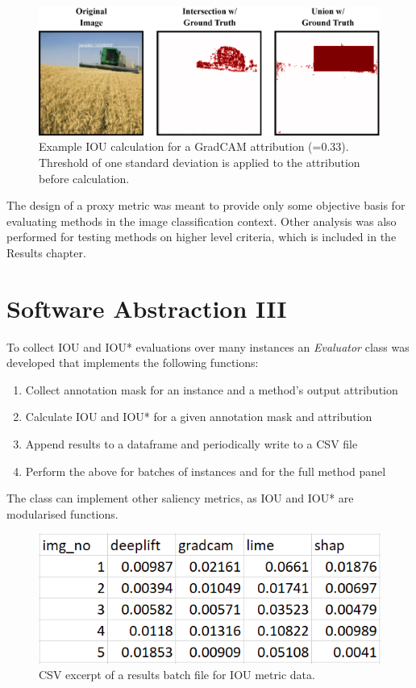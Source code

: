 \documentclass[main]{subfiles}
\begin{document}
\begin{figure}[htbp]
\centering
\includegraphics[scale=0.22]{iou_example.png}
\caption{Example IOU calculation for a GradCAM attribution  (=0.33). Threshold of one standard deviation is applied to the attribution before calculation.}
\label{iou_example_img}
\end{figure}

\newpage

The design of a proxy metric was meant to provide only some objective basis for evaluating methods in the image classification context. Other analysis was also performed for testing methods on higher level criteria, which is included in the Results chapter.


\section{Software Abstraction III}  \label{sec:sw3}

To collect IOU and IOU* evaluations over many instances an \textit{Evaluator} class was developed that implements the following functions:
\begin{enumerate}
\item Collect annotation mask for an instance and a method's output attribution
\item Calculate IOU and IOU* for a given annotation mask and attribution
\item Append results to a dataframe and periodically write to a CSV file
\item Perform the above for batches of instances and for the full method panel
\end{enumerate}

The class can implement other saliency metrics, as IOU and IOU* are modularised functions.

\begin{figure}[htbp]
\centering
\includegraphics[scale=0.4]{csv_output.png}
\caption{CSV excerpt of a results batch file for IOU metric data.}
\label{csv_image}
\end{figure}
\end{document}
